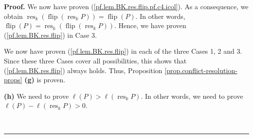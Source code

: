 \documentclass[numbers=enddot,12pt,final,onecolumn,notitlepage]{scrartcl}%
\theoremstyle{definition}
\newenvironment{proof}[1][Proof]{\noindent\textbf{#1.} }{\ \rule{0.5em}{0.5em}}
\newenvironment{verlong}{}{}
\begin{document}
\begin{verlong}
\begin{proof}
We now have proven (\ref{pf.lem.BK.res.flip.pf.c4.icol}). As a consequence, we
obtain $\operatorname*{res}\nolimits_{k}\left(  \operatorname*{flip}\left(
\operatorname*{res}\nolimits_{k}P\right)  \right)  =\operatorname*{flip}%
\left(  P\right)  $. In other words, $\operatorname*{flip}\left(  P\right)
=\operatorname*{res}\nolimits_{k}\left(  \operatorname*{flip}\left(
\operatorname*{res}\nolimits_{k}P\right)  \right)  $. Hence, we have proven
(\ref{pf.lem.BK.res.flip}) in Case 3.

We now have proven (\ref{pf.lem.BK.res.flip}) in each of the three Cases 1, 2
and 3. Since these three Cases cover all possibilities, this shows that
(\ref{pf.lem.BK.res.flip}) always holds. Thus, Proposition
\ref{prop.conflict-resolution-props} \textbf{(g)} is proven.

\textbf{(h)} We need to prove $\ell\left(  P\right)  >\ell\left(
\operatorname*{res}\nolimits_{k}P\right)  $. In other words, we need to prove
$\ell\left(  P\right)  -\ell\left(  \operatorname*{res}\nolimits_{k}P\right)
>0$.


\end{proof}
\end{verlong}
\end{document}
